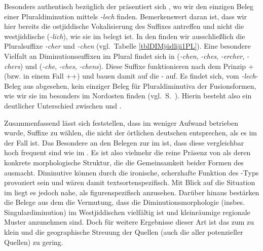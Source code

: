     Besonders authentisch bezüglich der  präsentiert sich , wo wir den einzigen Beleg einer Pluraldiminution mittels \textit{-lech} finden. Bemerkenswert daran ist, dass wir hier bereits die ostjiddische Vokalisierung des Suffixes antreffen und nicht die westjiddische (\textit{-lich}), wie sie im  belegt ist. In den  finden wir ausschließlich die Pluralsuffixe \textit{-cher} und \textit{-chen} (vgl.\, Tabelle \ref{tblDIMjüdliji1PL}). Eine besondere Vielfalt an Diminutionssuffixen im Plural findet sich in  (\textit{-chen}, \textit{-ches}, \textit{-ercher}, \textit{-chers}) und  (\textit{-che}, \textit{-ches}, \textit{-chens}). Diese Suffixe funktionieren nach dem Prinzip +\hai{{\Pl}} (bzw. in einem Fall \hai{{\Pl}}++\hai{{\Pl}}) und bauen damit auf die - auf. Es findet sich, vom \textit{-lech}-Beleg aus  abgesehen, kein einziger Beleg für Pluraldiminutiva der Fusionsformen, wie wir sie im  besonders im Nordosten finden (vgl.\, S.\, \pageref{LKinberlin}). Hierin besteht also ein deutlicher Unterschied zwischen  und . 

Zusammenfassend lässt sich feststellen, dass im  weniger Aufwand betrieben wurde, Suffixe zu wählen, die nicht der örtlichen deutschen  entsprechen, als es im  der Fall ist. Das Besondere an den Belegen zur  im  ist, dass diese vergleichbar hoch frequent sind wie im . Es ist also vielmehr die reine Präsenz von  als deren konkrete morphologische Struktur, die die Gemeinsamkeit beider Formen des \hai{{\LiJieins}} ausmacht. Diminutive können durch die ironische, scherzhafte Funktion des -Typs provoziert sein und wären damit textsortenspezifisch. Mit Blick auf die Situation im  liegt es jedoch nahe,  als figurenspezifisch  anzusehen. Darüber hinaus bestärken die Belege aus dem  die Vermutung, dass die Diminutionsmorphologie (insbes. Singulardiminution) im Westjiddischen vielfältig ist und kleinräumige regionale Muster anzunehmen sind. Doch für weitere Ergebnisse dieser Art ist das  zum  zu klein und die geographische Streuung der Quellen (auch die aller potenzieller Quellen) zu gering.

